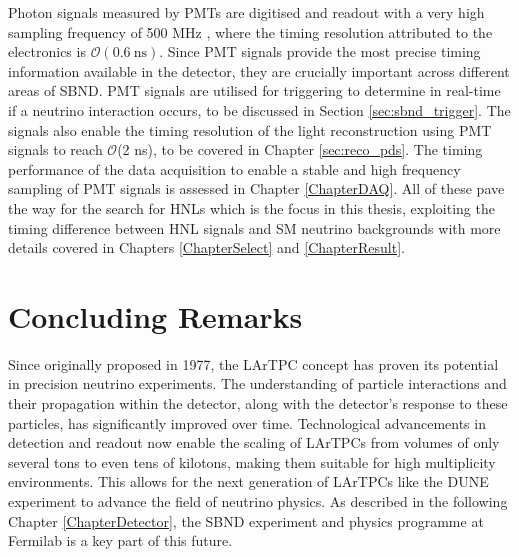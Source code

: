 Photon signals measured by PMTs are digitised and readout with a very high sampling frequency of 500 MHz \cite{sbnd_det}, 
where the timing resolution attributed to the electronics is $\mathcal{O}(0.6~\mathrm{ns})$.
Since PMT signals provide the most precise timing information available in the detector, they are crucially important across different areas of SBND.
PMT signals are utilised for triggering to determine in real-time if a neutrino interaction occurs, to be discussed in Section \ref{sec:sbnd_trigger}.
The signals also enable the timing resolution of the light reconstruction using PMT signals to reach $\mathcal{O}$(2 ns), to be covered in Chapter \ref{sec:reco_pds}.
The timing performance of the data acquisition to enable a stable and high frequency sampling of PMT signals is assessed in Chapter \ref{ChapterDAQ}.
All of these pave the way for the search for HNLs which is the focus in this thesis, exploiting the timing difference between HNL signals and SM neutrino backgrounds with more details covered in Chapters \ref{ChapterSelect} and \ref{ChapterResult}.

\section{Concluding Remarks}
\label{lartpcConclude}
Since originally proposed in 1977, the LArTPC concept has proven its potential in precision neutrino experiments.
The understanding of particle interactions and their propagation within the detector, along with the detector's response to these particles, has significantly improved over time. 
Technological advancements in detection and readout now enable the scaling of LArTPCs from volumes of only several tons to even tens of kilotons, making them suitable for high multiplicity environments.
This allows for the next generation of LArTPCs like the DUNE experiment to advance the field of neutrino physics.
As described in the following Chapter \ref{ChapterDetector}, the SBND experiment and physics programme at Fermilab is a key part of this future.

